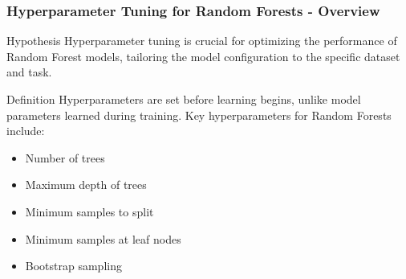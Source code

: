 \documentclass[aspectratio=169]{beamer}
\begin{document}
\begin{frame}[fragile]
    \frametitle{Hyperparameter Tuning for Random Forests - Overview}
    \begin{block}{Hypothesis}
        Hyperparameter tuning is crucial for optimizing the performance of Random Forest models, tailoring the model configuration to the specific dataset and task.
    \end{block}
    
    \begin{block}{Definition}
        Hyperparameters are set before learning begins, unlike model parameters learned during training. Key hyperparameters for Random Forests include:
        \begin{itemize}
            \item Number of trees
            \item Maximum depth of trees
            \item Minimum samples to split
            \item Minimum samples at leaf nodes
            \item Bootstrap sampling
        \end{itemize}
    \end{block}
\end{frame}
\end{document}
